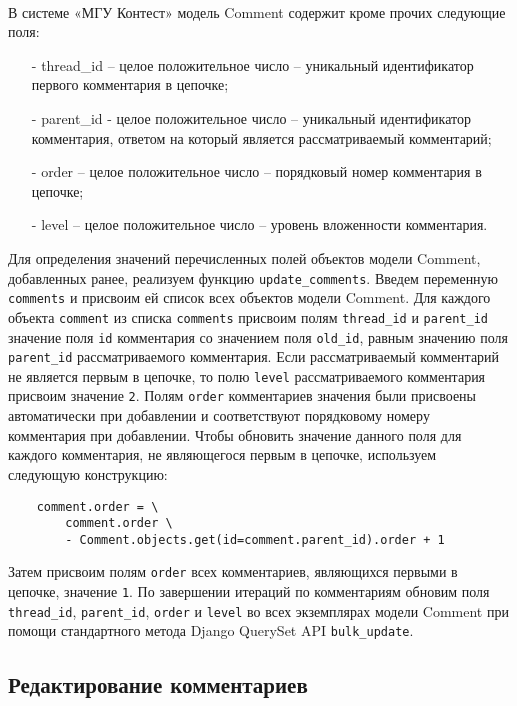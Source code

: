 \documentclass[12pt, a4paper, oneside]{article}
\begin{document}
\paragraph{}
В системе «МГУ Контест» модель Comment содержит кроме прочих следующие поля:
\begin{itemize}
    \item[-] thread\_id – целое положительное число – уникальный идентификатор первого комментария в цепочке;
    \item[-] parent\_id - целое положительное число – уникальный идентификатор комментария, ответом на который является рассматриваемый комментарий;
    \item[-] order – целое положительное число – порядковый номер комментария в цепочке;
    \item[-] level – целое положительное число – уровень вложенности комментария.
\end{itemize}
Для определения значений перечисленных полей объектов модели Comment, добавленных ранее, реализуем функцию \texttt{update\_comments}. Введем переменную \texttt{comments} и присвоим ей список всех объектов модели Comment. Для каждого объекта \texttt{comment} из списка \texttt{comments} присвоим полям \texttt{thread\_id} и \texttt{parent\_id} значение поля \texttt{id} комментария со значением поля \texttt{old\_id}, равным значению поля \texttt{parent\_id} рассматриваемого комментария. Если рассматриваемый комментарий не является первым в цепочке, то полю \texttt{level} рассматриваемого комментария присвоим значение \texttt{2}. Полям \texttt{order} комментариев значения были присвоены автоматически при добавлении и соответствуют порядковому номеру комментария при добавлении. Чтобы обновить значение данного поля для каждого комментария, не являющегося первым в цепочке, используем следующую конструкцию:
\begin{verbatim}
    comment.order = \
        comment.order \
        - Comment.objects.get(id=comment.parent_id).order + 1
\end{verbatim}
Затем присвоим полям \texttt{order} всех комментариев, являющихся первыми в цепочке, значение \texttt{1}. По завершении итераций по комментариям обновим поля \texttt{thread\_id}, \texttt{parent\_id}, \texttt{order} и \texttt{level} во всех экземплярах модели Comment при помощи стандартного метода Django QuerySet API \texttt{bulk\_update}.
\vspace{1cm}

\subsection{Редактирование комментариев}
\end{document}

